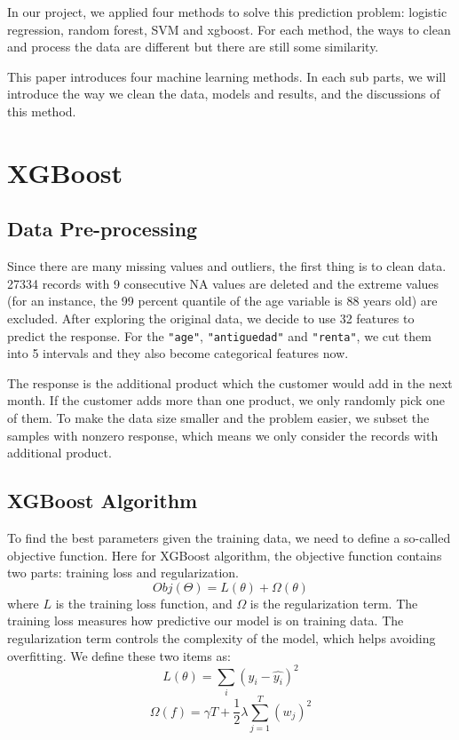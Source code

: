 \documentclass{article}
\begin{document}
\begin{spacing}{1}
\begin{large}
In our project, we applied four methods to solve this prediction problem: logistic regression, random forest, SVM and xgboost. For each method, the ways to clean and process the data are different but there are still some similarity.

This paper introduces four machine learning methods. In each sub parts, we will introduce the way we clean the data, models and results, and the discussions of this method.

\section{XGBoost}


\subsection{Data Pre-processing}

\noindent \indent Since there are many missing values and outliers, the first thing is to clean data. 27334 records with 9 consecutive NA values are deleted and the extreme values (for an instance, the 99 percent quantile of the age variable is 88 years old) are excluded. After exploring the original data, we decide to use 32 features to predict the response. For the \verb|"age"|, \verb|"antiguedad"| and \verb|"renta"|, we cut them into 5 intervals and they also become categorical features now.

The response is the additional product which the customer would add in the next month. If the customer adds more than one product, we only randomly pick one of them. To make the data size smaller and the problem easier, we subset the samples with nonzero response, which means we only consider the records with additional product.

\subsection{XGBoost Algorithm}

\noindent \indent To find the best parameters given the training data, we need to define a so-called objective function. Here for XGBoost algorithm, the objective function contains two parts: training loss and regularization.
\[
Obj(\Theta) = L(\theta) + \Omega(\theta)
\]
where $L$ is the training loss function, and $\Omega$ is the regularization term. The training loss measures how predictive our model is on training data. The regularization term controls the complexity of the model, which helps avoiding overfitting. We define these two items as:
\[
L(\theta) = \sum_{i}(y_i - \hat{y_i})^2
\]
\[
\Omega(f) = \gamma T + \frac{1}{2}\lambda\sum_{j = 1}^{T}(w_j)^2
\]





\end{large}
\end{spacing}
\end{document}
